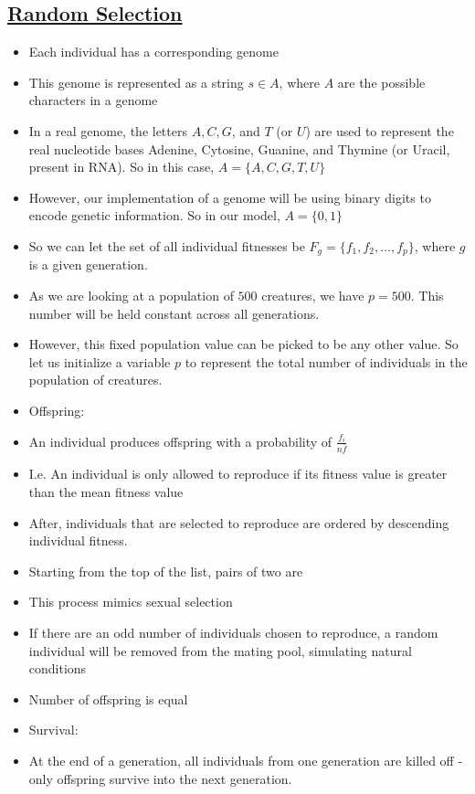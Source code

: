 \newpage
\subsection{\underline{Random Selection}}
\begin{itemize}
\item Each individual has a corresponding genome
\bi
\item This genome is represented as a string $s\in A$, where $A$ are the possible characters in a genome
\bi
\item In a real genome, the letters $A, C, G$, and $T$ (or $U$) are used to represent the real nucleotide bases Adenine, Cytosine, Guanine, and Thymine (or Uracil, present in RNA). So in this case, $A=\{A, C, G, T, U\}$
\item However, our implementation of a genome will be using binary digits to encode genetic information. So in our model, $A=\{0,1\}$
\ei
\item So we can let the set of all individual fitnesses be $F_g=\{f_1, f_2, \ldots, f_p\}$, where $g$ is a given generation.
\item As we are looking at a population of $500$ creatures, we have $p=500$. This number will be held constant across all generations.
\item However, this fixed population value can be picked to be any other value. So let us initialize a variable $p$ to represent the total number of individuals in the population of creatures. 
\ei
\item Offspring:
\bi
\item An individual produces offspring with a probability of $\frac{f_i}{n\bar{f}}$
\item I.e. An individual is only allowed to reproduce if its fitness value is greater than the mean fitness value
\item After, individuals that are selected to reproduce are ordered by descending individual fitness.
\item Starting from the top of the list, pairs of two are 
\bi
\item This process mimics sexual selection
\ei
\item If there are an odd number of individuals chosen to reproduce, a random individual will be removed from the mating pool, simulating natural conditions
\item Number of offspring is equal
\ei
\item Survival:
\bi
\item At the end of a generation, all individuals from one generation are killed off - only offspring survive into the next generation.
\ei
\end{itemize}

